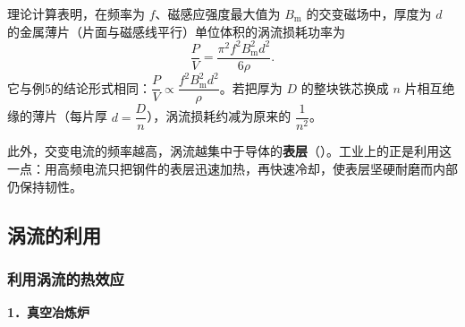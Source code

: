 \begin{tuozhan}[涡流损耗的定量规律]
理论计算表明，在频率为 $f$、磁感应强度最大值为 $B_{\mathrm m}$ 的交变磁场中，厚度为 $d$ 的金属薄片（片面与磁感线平行）单位体积的涡流损耗功率为
\[\frac{P}{V}=\frac{\pi^2f^2B_{\mathrm m}^2d^2}{6\rho} .\]
它与例5的结论形式相同：$\dfrac{P}{V}\propto\dfrac{f^2B_{\mathrm m}^2d^2}{\rho}$。若把厚为 $D$ 的整块铁芯换成 $n$ 片相互绝缘的薄片（每片厚 $d=\dfrac Dn$），涡流损耗约减为原来的 $\dfrac{1}{n^2}$。

此外，交变电流的频率越高，涡流越集中于导体的\textbf{表层}（）。工业上的正是利用这一点：用高频电流只把钢件的表层迅速加热，再快速冷却，使表层坚硬耐磨而内部仍保持韧性。
\end{tuozhan}

\subsection{涡流的利用}

\subsubsection{利用涡流的热效应}

\noindent\textbf{1．真空冶炼炉}


